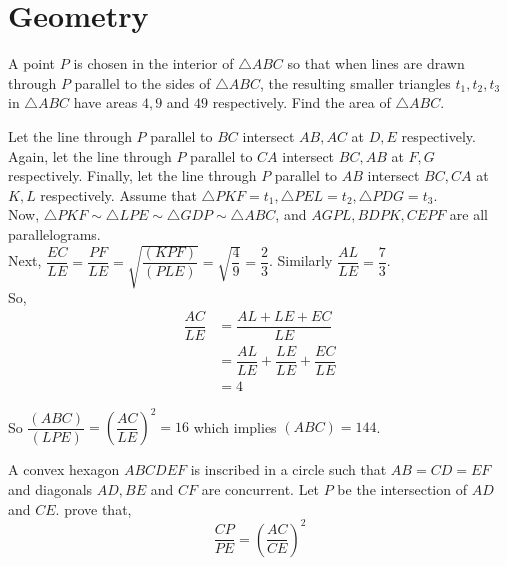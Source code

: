 \documentclass{subfile}
\begin{document}
	\section{Geometry}
	
	\begin{problem}
		A point $P$ is chosen in the interior of $\triangle ABC$ so that when lines are drawn through $P$ parallel to the sides of $\triangle ABC$, the resulting smaller triangles $t_{1},t_{2},t_{3}$ in $\triangle ABC$ have areas $4,9$ and $49$ respectively. Find the area of $\triangle ABC$.
	\end{problem}
	
	\begin{solution}
		Let the line through $P$ parallel to $BC$ intersect $AB,AC$ at $D,E$ respectively. Again, let the line through $P$ parallel to $CA$ intersect $BC,AB$ at $F,G$ respectively. Finally, let the line through $P$ parallel to $AB$ intersect $BC,CA$ at $K,L$ respectively. Assume that $\triangle PKF=t_1, \triangle PEL=t_2, \triangle PDG=t_3$.\\
		
		Now, $\triangle PKF\sim \triangle LPE\sim \triangle GDP\sim \triangle ABC$, and $AGPL, BDPK, CEPF$ are all parallelograms.\\
		Next, $\dfrac{EC}{LE}=\dfrac{PF}{LE}=\sqrt{\dfrac{(KPF)}{(PLE)}}=\sqrt{\dfrac{4}{9}}=\dfrac{2}{3}$. Similarly $\dfrac{AL}{LE}=\dfrac{7}{3}$.\\
		So, 
		    \begin{align*}
			    \dfrac{AC}{LE}& =\dfrac{AL+LE+EC}{LE}\\
		                   & =\dfrac{AL}{LE}+\dfrac{LE}{LE}+\dfrac{EC}{LE}\\
		                   & =4
		    \end{align*}

		So $\dfrac{(ABC)}{(LPE)}=\left(\dfrac{AC}{LE}\right)^2=16$ which implies $(ABC)=144$. 
	\end{solution}
	
	
	\begin{problem}
		A convex hexagon $ABCDEF$ is inscribed in a circle such that $AB=CD=EF$ and diagonals $AD,BE$ and $CF$ are concurrent. Let $P$ be the intersection of $AD$ and $CE$. prove that,
		\[\dfrac{CP}{PE}=\left(\dfrac{AC}{CE}\right)^2\]
	\end{problem}
	
\end{document}
